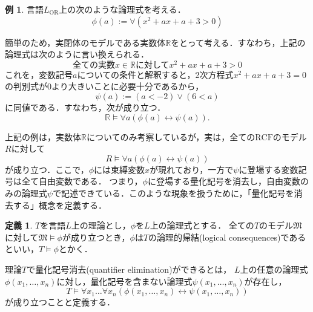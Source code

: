 \documentclass[uplatex, dvipdfmx]{jsarticle}
\newcommand{\R}{\mathbb{R}}
\newcommand{\M}{\mathfrak{M}}
\newcommand{\RCF}{\mathrm{RCF}}
\theoremstyle{definition}
\newtheorem{definition}{定義}[section]
\newtheorem{example}{例}[section]
\begin{document}

\begin{example}
     言語$L_\mathrm{OR}$上の次のような論理式を考える．
     \begin{equation*}
          \phi(a) := \forall (x^2 + ax + a + 3 > 0)
     \end{equation*}

     簡単のため，実閉体のモデルである実数体$\R$をとって考える．すなわち，上記の論理式は次のように言い換えられる．
     \begin{equation*}
          \text{全ての実数$x \in \R$に対して} x^2 + ax + a + 3 > 0
     \end{equation*}
     これを，変数記号$a$についての条件と解釈すると，2次方程式$x^2 + ax + a + 3 = 0$の判別式が0より大きいことに必要十分であるから，
     \begin{equation*}
          \psi(a) := (a < -2) \lor (6 < a)
     \end{equation*}
     に同値である．すなわち，次が成り立つ．
     \begin{equation*}
          \R \models \forall a (\phi(a) \leftrightarrow \psi(a)).
     \end{equation*}
\end{example}

上記の例は，実数体$\R$についてのみ考察しているが，実は，全ての$\RCF$のモデル$R$に対して
\begin{equation*}
     R \models \forall a (\phi(a) \leftrightarrow \psi(a))
\end{equation*}
が成り立つ．ここで，$\phi$には束縛変数$x$が現れており，一方で$\psi$に登場する変数記号は全て自由変数である．
つまり，$\phi$に登場する量化記号を消去し，自由変数のみの論理式$\psi$で記述できている．このような現象を扱うために，「量化記号を消去する」概念を定義する．


\begin{definition}
$T$を言語$L$上の理論とし，$\phi$を$L$上の論理式とする．%
全ての$T$のモデル$\M$に対して$\M \models \phi$が成り立つとき，$\phi$は$T$の論理的帰結(logical consequences)であるといい，$T \models \phi$とかく．

理論$T$で量化記号消去(quantifier elimination)ができるとは，
$L$上の任意の論理式$\phi(x_1,\dots,x_n)$に対し，量化記号を含まない論理式$\psi(x_1,\dots, x_n)$が存在し，
\begin{equation*}
     T \models \forall x_1 \dots \forall x_n(\phi(x_1,\dots,x_n) \leftrightarrow \psi(x_1, \dots, x_n))
\end{equation*}
が成り立つことと定義する．
\end{definition}
\end{document}
